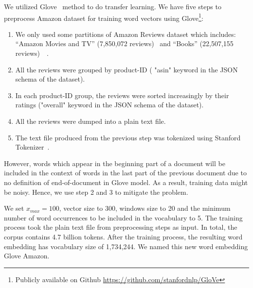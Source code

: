We utilized Glove~\cite{glove} method to do transfer learning.
%
We have five steps to preprocess Amazon dataset for training word vectors using Glove\footnote{Publicly available on Github \url{https://github.com/stanfordnlp/GloVe}}:
\begin{enumerate}
	\item We only used some partitions of Amazon Reviews dataset which includes:  ``Amazon Movies and TV'' (7,850,072 reviews)~\cite{mcauley2013hidden} and ``Books'' (22,507,155 reviews)~\cite{McAuleyTSH15}~\cite{HeM16}.
	\item All the reviews were grouped by product-ID ( "asin" keyword in the JSON schema of the dataset).
	\item In each product-ID group, the reviews were sorted increasingly by their ratings ("overall" keyword in the JSON schema of the dataset).
	\item All the reviews were dumped into a plain text file.
	\item The text file produced from the previous step was tokenized using Stanford Tokenizer~\cite{tokenizerpart}.
\end{enumerate}

However, words which appear in the beginning part of a document will be included in the context of words in the last part of the previous document due to no definition of end-of-document in Glove model. As a result, training data might be noisy. Hence, we use step 2 and 3 to mitigate the problem.

We set $x_{max} = 100$, vector size to 300, windows size to 20 and the minimum number of word occurrences to be included in the vocabulary to 5.
The training process took the plain text file from preprocessing steps as input.
In total, the corpus contains 4.7 billion tokens.
After the training process, the resulting word embedding has vocabulary size of 1,734,244.
We named this new word embedding Glove Amazon.
